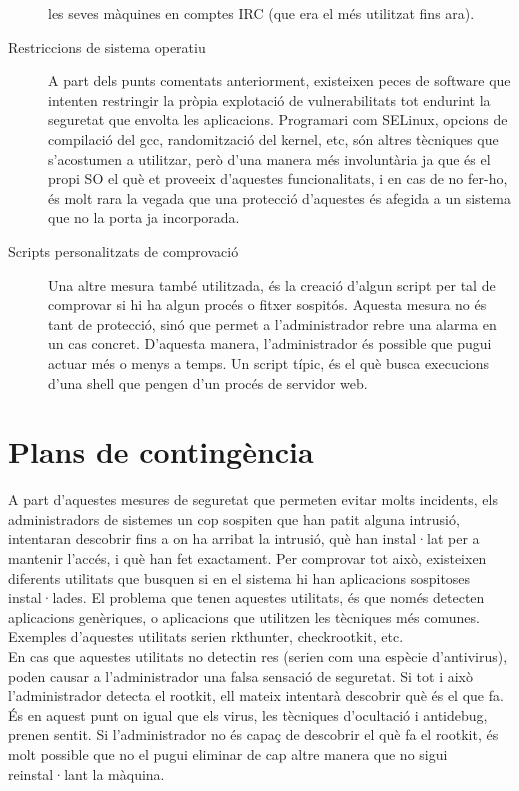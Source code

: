 \begin{description}
        les seves màquines en comptes IRC (que era el més utilitzat fins ara).
    \item[Restriccions de sistema operatiu] A part dels punts comentats anteriorment, existeixen peces de 
        software que intenten restringir la pròpia explotació de vulnerabilitats tot endurint la seguretat que 
        envolta les aplicacions. Programari com SELinux, opcions de compilació del gcc, randomització del kernel, 
        etc, són altres tècniques que s'acostumen a utilitzar, però d'una manera més involuntària ja que és 
        el propi SO el què et proveeix d'aquestes funcionalitats, i en cas de no fer-ho, és molt rara la vegada
        que una protecció d'aquestes és afegida a un sistema que no la porta ja incorporada.
    \item[Scripts personalitzats de comprovació] Una altre mesura també utilitzada, és la creació d'algun script per tal de 
        comprovar si hi ha algun procés o fitxer sospitós. Aquesta mesura no és tant de protecció, sinó que 
        permet a l'administrador rebre una alarma en un cas concret. D'aquesta manera, l'administrador és possible
        que pugui actuar més o menys a temps. Un script típic, és el què busca execucions d'una shell que pengen
        d'un procés de servidor web.
\end{description}

\section{Plans de contingència}

A part d'aquestes mesures de seguretat que permeten evitar molts incidents, els administradors de sistemes un cop
sospiten que han patit alguna intrusió, intentaran descobrir fins a on ha arribat la intrusió, què han instal·lat 
per a mantenir l'accés, i què han fet exactament. Per comprovar tot això, existeixen diferents utilitats que busquen si en 
el sistema hi han aplicacions sospitoses instal·lades. El problema que tenen aquestes utilitats, és que només detecten
aplicacions genèriques, o aplicacions que utilitzen les tècniques més comunes. Exemples d'aquestes utilitats serien 
rkthunter, checkrootkit, etc. \\

En cas que aquestes utilitats no detectin res (serien com una espècie d'antivirus), poden causar a l'administrador
una falsa sensació de seguretat. Si tot i això l'administrador detecta el rootkit, ell mateix intentarà descobrir 
què és el que fa. És en aquest punt on igual  que els virus, les tècniques d'ocultació i antidebug, prenen sentit.
Si l'administrador no és capaç de descobrir el què fa el rootkit, és molt possible que no el pugui eliminar de cap
altre manera que no sigui reinstal·lant la màquina. \\

